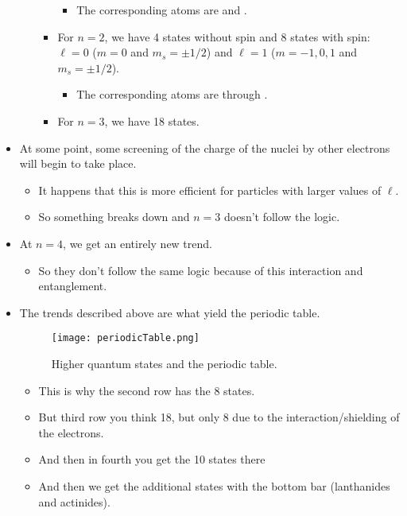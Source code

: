 \documentclass[../notes.tex]{subfiles}
\begin{document}
\begin{itemize}
\begin{itemize}
\begin{itemize}
            \begin{itemize}
                \item The corresponding atoms are  and .
            \end{itemize}
            \item For $n=2$, we have 4 states without spin and 8 states with spin: $\ell=0$ ($m=0$ and $m_s=\pm 1/2$) and $\ell=1$ ($m=-1,0,1$ and $m_s=\pm 1/2$).
            \begin{itemize}
                \item The corresponding atoms are  through .
            \end{itemize}
            \item For $n=3$, we have 18 states.
        \end{itemize}
    \end{itemize}
    \item At some point, some screening of the charge of the nuclei by other electrons will begin to take place.
    \begin{itemize}
        \item It happens that this is more efficient for particles with larger values of $\ell$.
        \item So something breaks down and $n=3$ doesn't follow the logic.
    \end{itemize}
    \item At $n=4$, we get an entirely new trend.
    \begin{itemize}
        \item So they don't follow the same logic because of this interaction and entanglement.
    \end{itemize}
    \item The trends described above are what yield the periodic table.
    \begin{figure}[H]
        \centering
        \texttt{[image: periodicTable.png]}
        \caption{Higher quantum states and the periodic table.}
        \label{fig:periodicTable}
    \end{figure}
    \begin{itemize}
        \item This is why the second row has the 8 states.
        \item But third row you think 18, but only 8 due to the interaction/shielding of the electrons.
        \item And then in fourth you get the 10 states there
        \item And then we get the additional states with the bottom bar (lanthanides and actinides).

\end{itemize}
\end{itemize}
\end{document}

